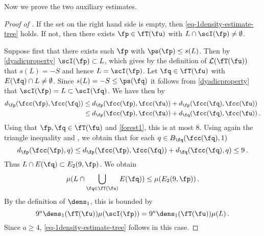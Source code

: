 Now we prove the two auxiliary estimates.

\begin{proof}[Proof of ]
    If the set on the right hand side is empty, then \eqref{eq-1density-estimate-tree} holds. If not, then there exists $\fp \in \fT(\fu)$ with $L \cap \scI(\fp) \ne \emptyset$.

    Suppose first that there exists such $\fp$ with $\ps(\fp) \le s(L)$. Then by \eqref{dyadicproperty} $\scI(\fp) \subset L$, which gives by the definition of $\mathcal{L}(\fT(\fu))$ that $s(L) = -S$ and hence $L = \scI(\fp)$. Let $\fq \in \fT(\fu)$ with $E(\fq) \cap L \ne \emptyset$. Since $s(L) = -S \le \ps(\fq)$ it follows from \eqref{dyadicproperty} that $\scI(\fp) = L \subset \scI(\fq)$. We have then by 
    \begin{align*}
        d_{\fp}(\fcc(\fp), \fcc(\fq)) &\le d_{\fp}(\fcc(\fp), \fcc(\fu)) + d_{\fp}(\fcc(\fq), \fcc(\fu))\\
        &\le d_{\fp}(\fcc(\fp), \fcc(\fu)) + d_{\fq}(\fcc(\fq), \fcc(\fu))\,.
    \end{align*}
    Using that $\fp, \fq \in \fT(\fu)$ and \eqref{forest1}, this is at most $8$. Using again the triangle inequality and , we obtain that for each $q \in B_{\fq}(\fcc(\fq), 1)$
    $$
        d_{\fp}(\fcc(\fp), q) \le d_{\fp}(\fcc(\fp), \fcc(\fq)) + d_{\fq}(\fcc(\fq), q) \le 9\,.
    $$
    Thus $L \cap E(\fq) \subset E_2(9, \fp)$. We obtain
    $$
        \mu(L \cap \bigcup_{\fq \in \fT(\fu)} E(\fq)) \le \mu(E_2(9, \fp))\,.
    $$
    By the definition of $\dens_1$, this is bounded by
    $$
        9^a \dens_1(\fT(\fu)) \mu(\scI(\fp)) =9^a \dens_1(\fT(\fu)) \mu(L)\,.
    $$
    Since $a \ge 4$, \eqref{eq-1density-estimate-tree} follows in this case.


\end{proof}

